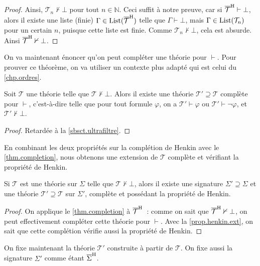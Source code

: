 \begin{proof}
  Ainsi, $\mathcal T_n\nvdash\bot$ pour tout $n\in \mathbb N$. Ceci suffit à
  notre preuve, car si $\overline{\mathcal T}^{\mathrm H}\vdash \bot$, alors il existe une
  liste (finie) $\Gamma\in\operatorname{List}(\overline{\mathcal T}^{\mathrm H})$ telle que
  $\Gamma\vdash\bot$, mais $\Gamma\in\operatorname{List}(\mathcal T_n)$ pour un certain $n$,
  puisque cette liste est finie. Comme $\mathcal T_n\nvdash\bot$, cela est
  absurde. Ainsi $\overline{\mathcal T}^{\mathrm H}\nvdash\bot$.
\end{proof}

On va maintenant énoncer qu'on peut compléter une théorie pour $\vdash$. Pour
prouver ce théorème, on va utiliser un contexte plus adapté qui est celui du
\cref{chp.ordres}.

\begin{theorem}\label{thm.completion}
  Soit $\mathcal T$ une théorie telle que $\mathcal T \nvdash \bot$. Alors il
  existe une théorie $\mathcal T' \supseteq \mathcal T$ complète pour $\vdash$,
  c'est-à-dire telle que pour tout formule $\varphi$, on a
  $\mathcal T'\vdash \varphi$ ou $\mathcal T'\vdash \lnot \varphi$, et
  $\mathcal T'\nvdash\bot$.
\end{theorem}

\begin{proof}
  Retardée à la \cref{sbsct.ultrafiltre}.
\end{proof}

En combinant les deux propriétés sur la complétion de Henkin avec le
\cref{thm.completion}, nous obtenons une extension de $\mathcal T$ complète et
vérifiant la propriété de Henkin.

\begin{lemma}
  Si $\mathcal T$ est une théorie sur $\Sigma$ telle que
  $\mathcal T\nvdash\bot$, alors il existe une signature
  $\Sigma'\supseteq\Sigma$ et une théorie
  $\mathcal T'\supseteq\mathcal T$ sur $\Sigma'$, complète et possédant la
  propriété de Henkin.
\end{lemma}

\begin{proof}
  On applique le \cref{thm.completion} à $\overline{\mathcal T}^{\mathrm H}$~: comme on sait
  que $\overline{\mathcal T}^{\mathrm H}\nvdash\bot$, on peut effectivement compléter cette
  théorie pour $\vdash$. Avec la \cref{prop.henkin.ext}, on sait que cette
  complétion vérifie aussi la propriété de Henkin.
\end{proof}

On fixe maintenant la théorie $\mathcal T'$ construite à partir de $\mathcal T$.
On fixe aussi la signature $\Sigma'$ comme étant $\overline{\Sigma}^{\mathrm H}$.

